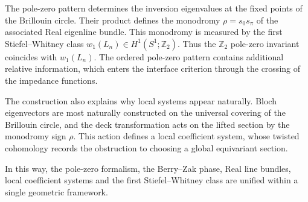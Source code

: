 \documentclass[preprint,12pt]{elsarticle}
\begin{document}
The pole-zero pattern determines the inversion eigenvalues at the fixed points of the Brillouin circle. Their product defines the monodromy
$\rho=s_0s_\pi$ of the associated Real eigenline bundle. This monodromy is measured by the first Stiefel--Whitney class
$w_1(L_n)\in H^1(S^1;\mathbb Z_2)$. Thus the $\mathbb Z_2$ pole-zero invariant coincides with $w_1(L_n)$.
The ordered pole-zero pattern contains additional relative information, which enters the interface criterion through the crossing of the
impedance functions.

The construction also explains why local systems appear naturally. Bloch eigenvectors are most naturally constructed on the universal covering of the Brillouin circle, and the deck transformation acts on the lifted section by the monodromy sign $\rho$. This action defines a local coefficient system, whose twisted cohomology records the obstruction to choosing a global equivariant section.

In this way, the pole-zero formalism, the Berry--Zak phase, Real line bundles, local coefficient systems and the first Stiefel--Whitney class are unified within a single geometric framework.
\end{document}
